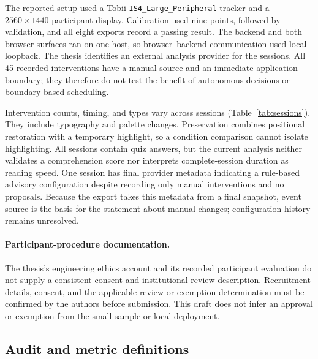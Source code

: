 The reported setup used a Tobii \texttt{IS4\_Large\_Peripheral} tracker and a $2560\times1440$ participant display. Calibration used nine points, followed by validation, and all eight exports record a passing result. The backend and both browser surfaces ran on one host, so browser--backend communication used local loopback. The thesis identifies an external analysis provider for the sessions. All 45 recorded interventions have a manual source and an immediate application boundary; they therefore do not test the benefit of autonomous decisions or boundary-based scheduling.

\begin{table}[t]
\caption{Recorded sessions. M = \textit{Metal Detectors}; N = \textit{Nuclear Science}. Duration covers the exported session, including activities beyond reading. Valid gaze means at least one eye was marked valid. \on{} bundles positional restoration and highlighting.}
\label{tab:sessions}
\centering

\end{table}

Intervention counts, timing, and types vary across sessions (Table~\ref{tab:sessions}). They include typography and palette changes. Preservation combines positional restoration with a temporary highlight, so a condition comparison cannot isolate highlighting. All sessions contain quiz answers, but the current analysis neither validates a comprehension score nor interprets complete-session duration as reading speed. One \off{} session has final provider metadata indicating a rule-based advisory configuration despite recording only manual interventions and no proposals. Because the export takes this metadata from a final snapshot, event source is the basis for the statement about manual changes; configuration history remains unresolved.

\paragraph{Participant-procedure documentation.}
The thesis's engineering ethics account and its recorded participant evaluation do not supply a consistent consent and institutional-review description. Recruitment details, consent, and the applicable review or exemption determination must be confirmed by the authors before submission. This draft does not infer an approval or exemption from the small sample or local deployment.

\subsection{Audit and metric definitions}

